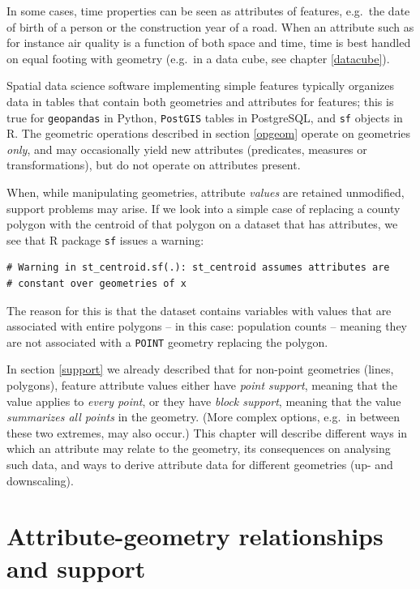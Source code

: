 \documentclass[]{book}
\begin{document}
In some cases, time properties can be seen as attributes of
features, e.g.~the date of birth of a person or the construction
year of a road. When an attribute such as for instance air quality
is a function of both space and time, time is best handled on
equal footing with geometry (e.g.~in a data cube, see chapter
\ref{datacube}).

Spatial data science software implementing simple features
typically organizes data in tables that contain both geometries and
attributes for features; this is true for \texttt{geopandas} in Python,
\texttt{PostGIS} tables in PostgreSQL, and \texttt{sf} objects in R. The geometric
operations described in section \ref{opgeom} operate
on geometries \emph{only}, and may occasionally yield new attributes
(predicates, measures or transformations), but do not operate on
attributes present.

When, while manipulating geometries, attribute \emph{values} are retained
unmodified, support problems may arise.
If we look into a simple case of replacing a county polygon with
the centroid of that polygon on a dataset that has attributes,
we see that R package \texttt{sf} issues a warning:

\begin{verbatim}
# Warning in st_centroid.sf(.): st_centroid assumes attributes are
# constant over geometries of x
\end{verbatim}

The reason for this is that the dataset contains variables with
values that are associated with entire polygons -- in this case:
population counts -- meaning they are not associated with a
\texttt{POINT} geometry replacing the polygon.

In section \ref{support} we already described that for non-point
geometries (lines, polygons), feature attribute values either
have \emph{point support}, meaning that the value applies to \emph{every
point}, or they have \emph{block support}, meaning that the value
\emph{summarizes all points} in the geometry. (More complex options,
e.g.~in between these two extremes, may also occur.) This chapter
will describe different ways in which an attribute may relate to
the geometry, its consequences on analysing such data, and ways to
derive attribute data for different geometries (up- and downscaling).

\hypertarget{agr}{%
\section{Attribute-geometry relationships and support}\label{agr}}
\end{document}
